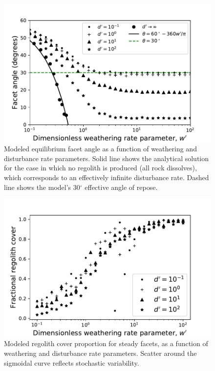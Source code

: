 \begin{figure}[ht!]
\centerline{\includegraphics{Figures/facet_angle_vs_wprime.pdf}}
\caption{Modeled equilibrium facet angle as a function of weathering and disturbance rate parameters. Solid line shows the analytical solution for the case in which no regolith is produced (all rock dissolves), which corresponds to an effectively infinite disturbance rate. Dashed line shows the model's 30$^\circ$ effective angle of repose.}
\label{fig:angw}
\end{figure}

\begin{figure}[ht!]
\centerline{\includegraphics{Figures/reg_cover_vs_wprime.pdf}}
\caption{Modeled regolith cover proportion for steady facets, as a function of weathering and disturbance rate parameters. Scatter around the sigmoidal curve reflects stochastic variability.}
\label{fig:regw}
\end{figure}

